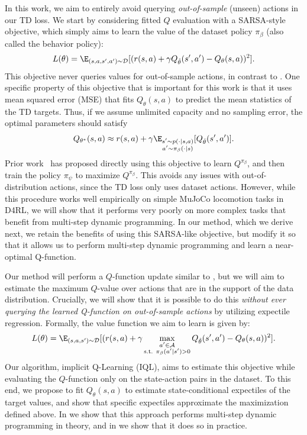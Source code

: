 \documentclass{article} %
\def\ourname{IQL\xspace}
\begin{document}
In this work, we aim to entirely avoid querying \emph{out-of-sample} (unseen) actions in our TD loss.
We start by considering fitted $Q$ evaluation with a SARSA-style objective, which simply aims to learn the value of the dataset policy $\pi_\beta$ (also called the behavior policy):
\begin{equation}
\label{eqn:td_sarsa}
L(\theta)=\E_{(s,a,s',a')\sim\D}[(r(s,a) + \gamma Q_{\hat{\theta}}(s', a') - Q_\theta(s,a))^2].
\end{equation}
This objective never queries values for out-of-sample actions, in contrast to . One specific property of this objective that is important for this work is that it uses mean squared error (MSE) that fits $Q_\theta(s,a)$ to predict the mean statistics of the TD targets. Thus, if we assume unlimited capacity and no sampling error, the optimal parameters should satisfy
\begin{equation}
    Q_{\theta^*}(s,a) \approx r(s,a) + \gamma \E_{\substack{s'\sim p(\cdot|s,a)\\a'\sim\pi_\beta(\cdot|s)}}[ Q_{\hat{\theta}}(s',a')].
\label{eqn:q_star}
\end{equation}
Prior work~\citep{brandfonbrener2021offline, peng2019advantage}
has proposed directly using this objective to learn $Q^{\pi_\beta}$, and then train the policy $\pi_\psi$ to maximize $Q^{\pi_\beta}$. This avoids any issues with out-of-distribution actions, since the TD loss only uses dataset actions. However, while this procedure works well empirically on simple MuJoCo locomotion tasks in D4RL, we will show that it performs very poorly on more complex tasks that benefit from multi-step dynamic programming. In our method, which we derive next, we retain the benefits of using this SARSA-like objective, but modify it so that it allows us to perform multi-step dynamic programming and learn a near-optimal Q-function.

Our method will perform a $Q$-function update similar to , but we will aim to estimate the maximum $Q$-value over actions that are in the support of the data distribution. Crucially, we will show that it is possible to do this \emph{without ever querying the learned Q-function on out-of-sample actions} by utilizing expectile regression. Formally, the value function we aim to learn is given by:
\begin{equation}
L(\theta) = \E_{(s, a, s')\sim\D}[(r(s,a) + \gamma  \max_{\substack{a'\in \A \\\text{s.t. }\pi_\beta(a'|s') > 0}}Q_{\hat{\theta}}(s',a') - Q_\theta(s,a))^2].
\label{eqn:bq_learning}
\end{equation}
Our algorithm, implicit Q-Learning (\ourname), aims to estimate this objective while evaluating the $Q$-function only on the state-action pairs in the dataset. To this end, we propose to fit $Q_\theta(s,a)$ to estimate state-conditional expectiles of the target values, and show that
specific expectiles approximate the maximization defined above.
In  we show that this approach performs multi-step dynamic programming in theory, and in  we show that it does so in practice.
\end{document}

